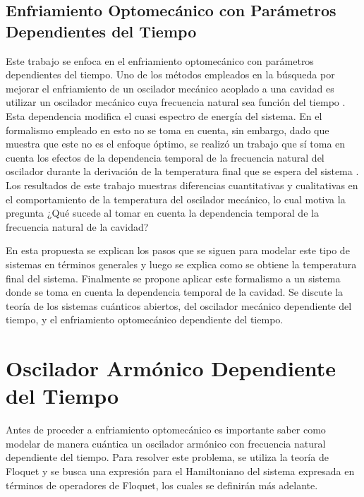 \documentclass[10pt,a4paper]{report}
\begin{document}
\section{Enfriamiento Optomecánico con Parámetros Dependientes del Tiempo}

Este trabajo se enfoca en el enfriamiento optomecánico con parámetros
dependientes del tiempo. Uno de los métodos empleados en la búsqueda
por mejorar el enfriamiento de un oscilador mecánico acoplado a una
cavidad es utilizar un oscilador mecánico cuya frecuencia natural sea
función del tiempo \cite{BarberisLC}. Esta dependencia modifica el
cuasi espectro de energía del sistema\cite{HanngiFM}. En el formalismo
empleado en \cite{BarberisLC} esto no se toma en cuenta, sin embargo,
dado que \cite{HanngiFM} muestra que este no es el enfoque óptimo, se
realizó un trabajo que sí toma en cuenta los efectos de la dependencia
temporal de la frecuencia natural del oscilador durante la derivación
de la temperatura final que se espera del sistema \cite{YanesOC}. Los
resultados de este trabajo muestras diferencias cuantitativas y
cualitativas en el comportamiento de la temperatura del oscilador
mecánico, lo cual motiva la pregunta ¿Qué sucede al tomar en cuenta la
dependencia temporal de la frecuencia natural de la cavidad?

En esta propuesta se explican los pasos que se siguen para modelar
este tipo de sistemas en términos generales y luego se explica como se
obtiene la temperatura final del sistema. Finalmente se propone
aplicar este formalismo a un sistema donde se toma en cuenta la
dependencia temporal de la  cavidad. Se
discute la teoría de los sistemas cuánticos abiertos, del oscilador
mecánico dependiente del tiempo, y el enfriamiento optomecánico
dependiente del tiempo.





\chapter{Oscilador Armónico Dependiente del Tiempo}

Antes de proceder a enfriamiento optomecánico es importante saber como
modelar de manera cuántica un oscilador armónico con frecuencia
natural dependiente del tiempo. Para resolver este problema, se
utiliza la teoría de Floquet \cite{WardFT} y se busca una expresión
para el Hamiltoniano del sistema expresada en términos de operadores
de Floquet, los cuales se definirán más adelante.
\end{document}

